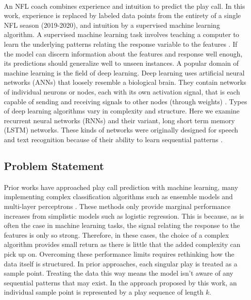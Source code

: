 \documentclass[11pt]{article}
\begin{document}
\begin{multicols*}{2}
            \paragraph{}
                An NFL coach combines experience and intuition to predict the play call. 
                In this work, experience is replaced by labeled data points from the entirety of a single NFL season (2019-2020), and intuition by a supervised machine learning algorithm. 
                A supervised machine learning task involves teaching a computer to learn the underlying patterns relating the response variable to the features \cite{Mehryar12}. 
                If the model can discern information about the features and response well enough, its predictions should generalize well to unseen instances. 
                A popular domain of machine learning is the field of deep learning. 
                Deep learning uses artificial neural networks (ANNs) that loosely resemble a biological brain. 
                They contain networks of individual neurons or nodes, each with its own activation signal, that is each capable of sending and receiving signals to other nodes (through weights) \cite{Haykin08}. 
                Types of deep learning algorithms vary in complexity and structure. 
                Here we examine recurrent neural networks (RNNs) and their variant, long short term memory (LSTM) networks. 
                These kinds of networks were originally designed for speech and text recognition because of their ability to learn sequential patterns \cite{Li15}. 

        \subsection{Problem Statement}
            \paragraph{}
                Prior works have approached play call prediction with machine learning, many implementing complex classification algorithms such as ensemble models and multi-layer perceptrons \cite{Patel20}.
                These methods only provide marginal performance increases from simplistic models such as logistic regression.
                This is because, as is often the case in machine learning tasks, the signal relating the response to the features is only so strong. 
                Therefore, in these cases, the choice of a complex algorithm provides small return as there is little that the added complexity can pick up on.
                Overcoming these performance limits requires rethinking how the data itself is structured.
                In prior approaches, each singular play is treated as a sample point. 
                Treating the data this way means the model isn't aware of any sequential patterns that may exist.
                In the approach proposed by this work, an individual sample point is represented by a play sequence of length $k$. 
        
        \end{multicols*}
\end{document}
